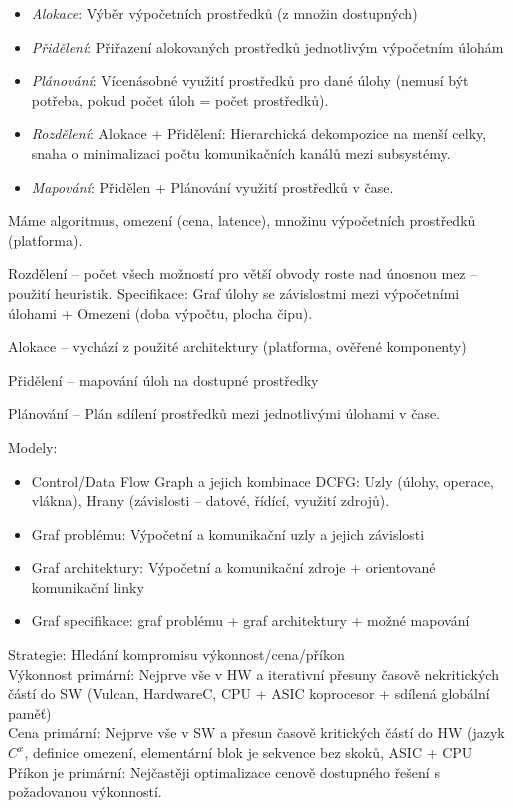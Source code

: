 \documentclass[a4paper, 11pt]{report}
\begin{document}
\begin{itemize}
	\item \emph{Alokace}: Výběr výpočetních prostředků (z množin dostupných)\\
	\item \emph{Přidělení}: Přiřazení alokovaných prostředků jednotlivým výpočetním úlohám
	\item \emph{Plánování}: Vícenásobné využití prostředků pro dané úlohy (nemusí být potřeba, pokud počet úloh = počet prostředků).\\
	\item \emph{Rozdělení}: Alokace + Přidělení: Hierarchická dekompozice na menší celky, snaha o minimalizaci počtu komunikačních kanálů mezi subsystémy.\\
	\item \emph{Mapování}: Přidělen + Plánování využití prostředků v čase.
\end{itemize}

Máme algoritmus, omezení (cena, latence), množinu výpočetních prostředků (platforma).

Rozdělení -- počet všech možností pro větší obvody roste nad únosnou mez -- použití heuristik. Specifikace: Graf úlohy se závislostmi mezi výpočetními úlohami + Omezeni (doba výpočtu, plocha čipu).

Alokace -- vychází z použité architektury (platforma, ověřené komponenty)

Přidělení -- mapování úloh na dostupné prostředky

Plánování -- Plán sdílení prostředků mezi jednotlivými úlohami v čase.

Modely:
\begin{itemize}
	\item Control/Data Flow Graph a jejich kombinace DCFG: Uzly (úlohy, operace, vlákna), Hrany (závislosti -- datové, řídící, využití zdrojů).
	\item Graf problému: Výpočetní a komunikační uzly a jejich závislosti
	\item Graf architektury: Výpočetní a komunikační zdroje + orientované komunikační linky
	\item Graf specifikace: graf problému + graf architektury + možné mapování
\end{itemize}

Strategie: Hledání kompromisu výkonnost/cena/příkon\\
Výkonnost primární: Nejprve vše v HW a iterativní přesuny časově nekritických částí do SW (Vulcan, HardwareC, CPU + ASIC koprocesor + sdílená globální paměť)\\
Cena primární: Nejprve vše v SW a přesun časově kritických částí do HW (jazyk $C^x$, definice omezení, elementární blok je sekvence bez skoků, ASIC + CPU \\
Příkon je primární: Nejčastěji optimalizace cenově dostupného řešení s požadovanou výkonností.
\end{document}
